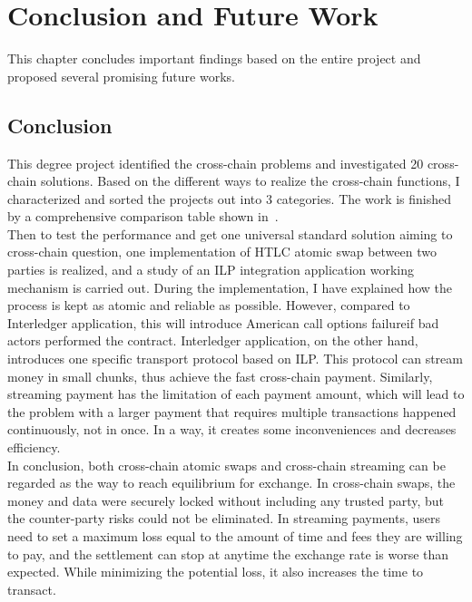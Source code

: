 \chapter{Conclusion and Future Work}
\label{chap:5}
\noindent This chapter concludes important findings based on the entire project and proposed several promising future works.
\section{Conclusion}
\label{sec:conclusion}
\noindent This degree project identified the cross-chain problems and investigated 20 cross-chain solutions. Based on the different ways to realize the cross-chain functions, I characterized and sorted the projects out into 3 categories. The work is finished by a comprehensive comparison table shown in~. \\

\noindent Then to test the performance and get one universal standard solution aiming to cross-chain question, one implementation of HTLC atomic swap between two parties is realized, and a study of an ILP integration application working mechanism is carried out. During the implementation, I have explained how the process is kept as atomic and reliable as possible. However, compared to Interledger application, this will introduce American call options failure\footnotemark[1] if bad actors performed the contract. Interledger application, on the other hand, introduces one specific transport protocol based on ILP. This protocol can stream money in small chunks, thus achieve the fast cross-chain payment. Similarly, streaming payment has the limitation of each payment amount, which will lead to the problem with a larger payment that requires multiple transactions happened continuously, not in once. In a way, it creates some inconveniences and decreases efficiency.  \\

\noindent  In conclusion, both cross-chain atomic swaps and cross-chain streaming can be regarded as the way to reach equilibrium for exchange. In cross-chain swaps, the money and data were securely locked without including any trusted party, but the counter-party risks could not be eliminated. In streaming payments, users need to set a maximum loss equal to the amount of time and fees they are willing to pay, and the settlement can stop at anytime the exchange rate is worse than expected. While minimizing the potential loss, it also increases the time to transact. \\

